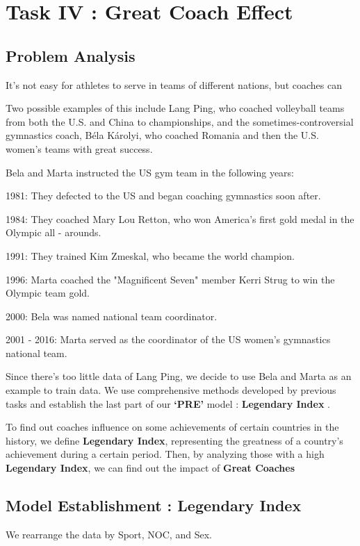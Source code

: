 

\section{Task IV : Great Coach Effect}

\subsection{Problem Analysis}
It's not easy for athletes to serve in teams of different nations, but coaches can

Two possible examples of this include Lang Ping,
who coached volleyball teams from both the U.S. and China to championships, and the
sometimes-controversial gymnastics coach, Béla Károlyi, who coached Romania and
then the U.S. women's teams with great success. 

Bela and Marta instructed the US gym team in the following years:

1981: They defected to the US and began coaching gymnastics soon after.

1984: They coached Mary Lou Retton, who won America's first gold medal in the Olympic all - arounds.

1991: They trained Kim Zmeskal, who became the world champion.

1996: Marta coached the "Magnificent Seven" member Kerri Strug to win the Olympic team gold.

2000: Bela was named national team coordinator.

2001 - 2016: Marta served as the coordinator of the US women's gymnastics national team.

Since there's too little data of Lang Ping, we decide to use Bela and Marta as an example to train data. We use comprehensive methods developed by previous tasks and establish the last part of our \textbf{`PRE'} model : \textbf{Legendary Index} .

To find out coaches influence on some achievements of certain countries in the history, we define \textbf{Legendary Index}, representing the greatness of a country's achievement during a certain period.
Then, by analyzing those with a high \textbf{Legendary Index}, we can find out the impact of \textbf{Great Coaches}

\subsection{Model Establishment : Legendary Index}
We rearrange the data by Sport, NOC, and Sex. 

